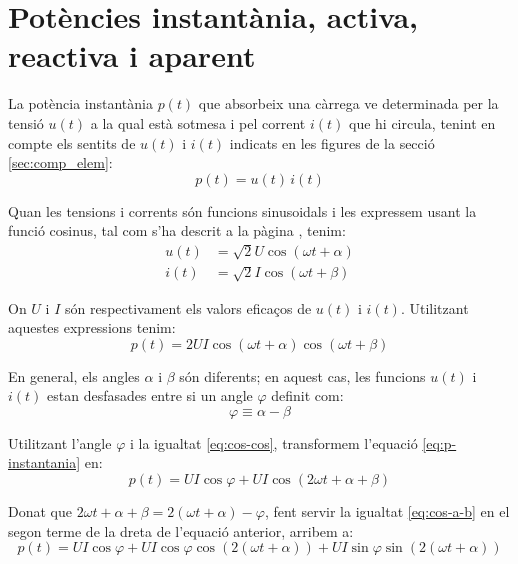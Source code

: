 \section{Potències instantània, activa,  reactiva i aparent}\label{sec:pot-inst-act-react}

La potència instantània $p(t)$ que absorbeix una càrrega ve determinada per la tensió $u(t)$ a la qual està sotmesa i pel corrent $i(t)$ que hi circula, tenint en compte els sentits de $u(t)$ i $i(t)$ indicats en les figures de la secció \ref{sec:comp_elem}:
\begin{equation}
   p(t) = u(t) \, i(t)
\end{equation}

Quan les tensions i corrents són funcions sinusoidals i les expressem usant la funció cosinus, tal com s'ha descrit a la pàgina \pageref{sec:fasors}, tenim:
\begin{align}
  u(t) &= \sqrt{2} U \cos(\omega t + \alpha) \\
  i(t) &= \sqrt{2} I \cos(\omega t + \beta)
\end{align}

On $U$ i $I$ són respectivament els valors eficaços de $u(t)$ i $i(t)$. Utilitzant aquestes expressions tenim:
\begin{equation}
   p(t) = 2 U I \cos(\omega t + \alpha) \cos(\omega t + \beta) \label{eq:p-instantania}
\end{equation}

En general, els angles $\alpha$ i $\beta$ són diferents; en aquest cas, les funcions $u(t)$ i $i(t)$ estan desfasades entre si un angle $\varphi$ definit com:
\begin{equation}
  \varphi \equiv \alpha - \beta
\end{equation}

Utilitzant l'angle $\varphi$ i la igualtat   \eqref{eq:cos-cos},  transformem l'equació \eqref{eq:p-instantania} en:
\begin{equation}
    p(t) = U I \cos\varphi + U I \cos(2\omega t + \alpha + \beta)  \label{eq:p-instantania-1}
\end{equation}

Donat que $2\omega t + \alpha + \beta = 2(\omega t+\alpha)-\varphi$,  fent servir la igualtat \eqref{eq:cos-a-b} en el segon terme de la dreta de l'equació anterior, arribem a:
\begin{equation}
   p(t) = U I \cos\varphi + U I \cos\varphi \cos (2 (\omega t + \alpha)) + U I \sin\varphi \sin (2 (\omega t + \alpha))
\end{equation}

